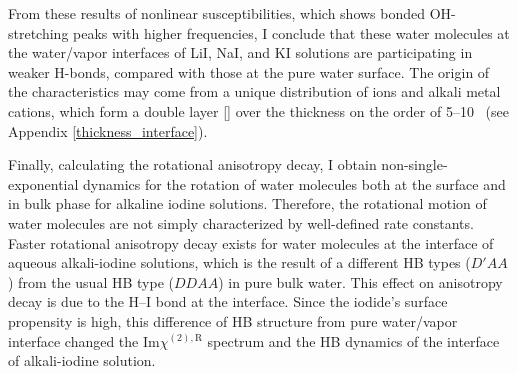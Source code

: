 From these results of nonlinear susceptibilities, which shows bonded OH-stretching peaks with higher frequencies, 
I conclude that these water molecules at the water/vapor interfaces of LiI, NaI, and KI solutions are participating 
in weaker H-bonds, compared with those at the pure water surface. 
The origin of the characteristics may come from a unique distribution of \I ions and alkali metal cations, 
which form a double layer [\cite{Shultz2010}] over the thickness on the order of 5--10 \A\ (see Appendix \ref{thickness_interface}).

Finally, calculating the rotational anisotropy decay, I obtain non-single-exponential dynamics 
for the rotation of water molecules both at the surface and in bulk phase for alkaline 
iodine solutions.
Therefore, the rotational motion of water molecules are not simply characterized by well-defined rate constants. 
Faster rotational anisotropy decay exists for water molecules at the interface of aqueous alkali-iodine solutions, which is the result of a different HB types ($D'AA$) 
from the usual HB type ($DDAA$) in pure bulk water. This effect on anisotropy decay is due to the H--I bond at the interface. 
Since the iodide's surface propensity is high, this difference of HB structure from pure water/vapor interface changed the Im$\chi^{(2),\text{R}}$ spectrum 
and the HB dynamics of the interface of alkali-iodine solution. 


